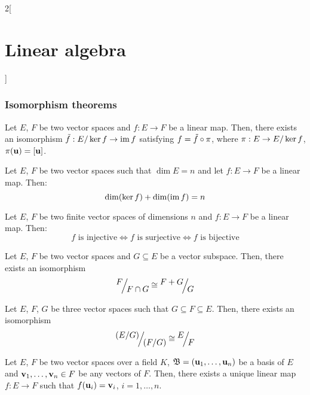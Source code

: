 \documentclass[../../../main.tex]{subfiles}
\begin{document}
\begin{multicols}{2}[\section{Linear algebra}]
\subsubsection*{Isomorphism theorems}
\begin{theorem}
    Let $E$, $F$ be two vector spaces and $f:E\rightarrow F$ be a linear map. Then, there exists an isomorphism $\Tilde{f}:\quot{E}{\ker f}\rightarrow \im f$ satisfying $f=\Tilde{f}\circ\pi$, where $\pi:E\rightarrow \quot{E}{\ker f}$, $\pi(\vb{u})=[\vb{u}]$.
\end{theorem}
\begin{corollary}
    Let $E$, $F$ be two vector spaces such that $\dim E=n$ and let $f:E\rightarrow F$ be a linear map. Then: $$\dim(\ker f)+\dim(\operatorname{im} f)=n$$
\end{corollary}
\begin{corollary}
    Let $E$, $F$ be two finite vector spaces of dimensions $n$ and $f:E\rightarrow F$ be a linear map. Then: $$f\text{ is injective}\iff f\text{ is surjective}\iff f\text{ is bijective}$$
\end{corollary}
\begin{theorem}
    Let $E$, $F$ be two vector spaces and $G\subseteq E$ be a vector subspace. Then, there exists an isomorphism $$\quot{F}{F\cap G}\cong\quot{F+G}{G}$$
\end{theorem}
\begin{theorem}
    Let $E$, $F$, $G$ be three vector spaces such that $G\subseteq F\subseteq E$. Then, there exists an isomorphism $$\quot{{(\textstyle\quot{E}{G})}}{{(\textstyle\quot{F}{G})}}\cong\quot{E}{F}$$
\end{theorem}
\begin{theorem}
    Let $E$, $F$ be two vector spaces over a field $K$, $\mathfrak{B}=(\vb{u}_1,\ldots,\vb{u}_n)$ be a basis of $E$ and $\vb{v}_1,\ldots,\vb{v}_n\in F$ be any vectors of $F$. Then, there exists a unique linear map $f:E\rightarrow F$ such that $f(\vb{u}_i)=\vb{v}_i$, $i=1,\ldots,n$. 
\end{theorem}

\end{multicols}
\end{document}
